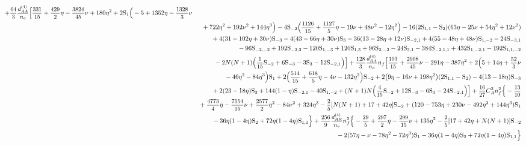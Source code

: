 \documentclass[
 twocolumn,
 superscriptaddress,
 preprintnumbers,
 nofootinbib,
 amsmath,amssymb,
 aps,
 prl
 ]{revtex4-2}
\newcommand\HS{\mathrm{S}}
\def\frct#1#2{\mbox{\small{$\displaystyle\frac{#1}{#2}$}}}
\begin{document}
\begin{widetext}
\begin{eqnarray}
+\frct{64}{3}\*\frct{d_{AA}^{(4)}}{n_a}\*
  \Big[
 \frct{331}{15}
+ \frct{429}{2}\*\eta
- \frct{3824}{45}\*\nu
+ 180\*\eta^2
+ 2\*\HS_{1} \*\Big(-5 + 1352\*\eta - \frct{1328}{3}\*\nu
\nonumber\\
&&{}
+ 722\*\eta^2
+ 192\*\nu^2
+ 144\*\eta^3
\Big)
- 4\*\HS_{-2}\*\Big(\frct{1126}{15}+\frct{1127}{5}\*\eta
- 19\*\nu + 48\*\nu^2 - 12\*\eta^2 \Big)
- 16\*(2\*\HS_{1,1}-\HS_{2})\*(63\*\eta - 25\*\nu + 54\*\eta^2 +12\*\nu^2)
\nonumber\\
&&{}
+4\*(31-102\*\eta+30\*\nu)\*\HS_{-3}
-4\*(43-66\*\eta+30\*\nu)\*\HS_{3}
-36\*(13-28\*\eta+12\*\nu)\*\HS_{-2,1}
+4\*(55-48\*\eta+48\*\nu)\*\HS_{1,-2}
-24\*\HS_{-3,1}
\nonumber\\
&&{}
-96\*\HS_{-2,-2}
+192\*\HS_{-2,2}
-120\*\HS_{1,-3}
+120\*\HS_{1,3}
+96\*\HS_{2,-2}
-24\*\HS_{3,1}
-384\*\HS_{-2,1,1}
+432\*\HS_{1,-2,1}
-192\*\HS_{1,1,-2}
\nonumber\\
&&{}
-2\* N\*(N+1)\*
   \Big(
\frct{1}{15}\* \HS_{-2}
+ 6\* \HS_{-3}
- 3\* \HS_{3}
- 12\* \HS_{-2, 1}
\Big)
\Big]


+\frct{128}{3}\*\frct{d_{RA}^{(4)}}{n_a}\*n_f\*\Big[
\frct{103}{15}
+\frct{2908}{45}\*\nu
-291\*\eta
-387\*\eta^2
+2\*\Big(
5
+ 14\*\eta
+\frct{52}{3}\*\nu
\nonumber\\
&&{}
- 46\*\eta ^2 - 84\*\eta ^3\Big)\*\HS_{1}
+2\*\Big(\frct{514}{15}+\frct{618}{5}\*\eta
- 4\*\nu
- 132\*\eta^2\Big)\*\HS_{-2}
+2\*\big(9\*\eta - 16\*\nu + 198\*\eta^2\big)\*(2\*\HS_{1,1}-\HS_{2})
- 4\* (13 - 18\* \eta)\* \HS_{-3}
\nonumber\\
&&{}
+ 2\* (23 - 18\* \eta)\* \HS_{3}
+ 144\* (1 - \eta)\* \HS_{-2, 1}
- 40\* \HS_{1, -2}
+(N+1)\*N\*\Big(
\frct{4}{15}\* \HS_{-2}
+ 12\* \HS_{-3}
- 6\* \HS_{3}
- 24\* \HS_{-2, 1}
\Big)
\Big]
+\frct{16}{27}\*C_A^2\*n_f^2\*\Big\{
-\frct{13}{10}
\nonumber\\
&&{}
+\frct{4773}{4}\*\eta
-\frct{7154}{15}\*\nu
+\frct{2577}{2}\*\eta^2
-84\*\nu^2
+324\*\eta^3
-\frct{2}{5}\*
[
N\*(N+1)
+17
+42\*\eta
]\*\HS_{-2}
+
(120
-753\*\eta
+230\*\nu
-492\*\eta^2
+144\*\eta^3
)\*\HS_{1}
\nonumber\\
&&{}
-36\*\eta\*
(
1
-4\*\eta)\*\HS_{2}
+72\*\eta\*
(
1
-4\*\eta)\*\HS_{1,1}\Big\}

+\frct{256}{9}\*\frct{d_{RR}^{(4)}}{n_a}\*n_f^2\*\Big\{
-\frct{29}{5}
+\frct{297}{2}\*\eta
-\frct{299}{15}\*\nu
+135\*\eta^2
-\frct{2}{5}\*
[17
+42\*\eta
+N\*(N+1) ] \*\HS_{-2}
\nonumber\\
&&{}
-2\*
(
57\*\eta
-\nu
-78\*\eta^2
-72\*\eta^3
)\*\HS_{1}
-36\*\eta\*
(
1
-4\*\eta)\*\HS_{2}
+72\*\eta\*
(
1
-4\*\eta)\*\HS_{1,1}\Big\}


\end{eqnarray}
\end{widetext}
\end{document}
